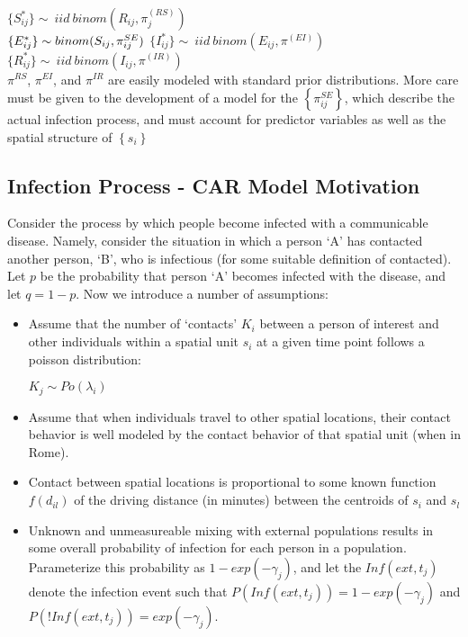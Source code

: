 \documentclass[12pt]{article}
\newcommand \noi {\noindent}
\begin{document}
    \vspace{0.15in}
        \noi
        $\{S_{ij}^*\} \sim\ iid\  binom(R_{ij}, \pi_j^{(RS)})$\\
        $\{E_{ij}^*\} \sim binom(S_{ij}, \pi^{SE}_{ij})\\$
        $\{I_{ij}^*\} \sim\ iid\  binom(E_{ij}, \pi^{(EI)})$\\
        $\{R_{ij}^*\} \sim\ iid\  binom(I_{ij}, \pi^{(IR)})$\\



$\pi^{RS}$, $\pi^{EI}$, and $\pi^{IR}$ are easily modeled with standard prior distributions. 
More care must be given to the development of a model for the $\left\{\pi^{SE}_{ij} \right\}$, which 
describe the actual infection process, and must account for predictor variables as well as the 
spatial structure of $\left\{ s_i \right\}$

\subsection{Infection Process - CAR Model Motivation}

Consider the process by which people become infected with a communicable disease. 
Namely, consider the situation in which a person `A' has contacted another person, `B', 
who is infectious (for some suitable definition of contacted). 
Let $p$ be the probability that person `A' becomes infected with the disease, and
let $q=1-p$. Now we introduce a number of assumptions:

\begin{itemize}

    \item Assume that the number of `contacts' $K_i$ between a person of interest 
    and other individuals within a spatial unit $s_i$ at a given time point follows a poisson 
    distribution:\\
    \begin{center}
        $K_j \sim Po(\lambda_i)$
    \end{center}
    \item Assume that when individuals travel to other spatial locations, their 
        contact behavior is well modeled by the contact behavior of that spatial unit (when in Rome).  
    \item Contact between spatial locations is proportional to some known function $f(d_{il})$
        of the driving distance (in minutes) between the centroids of $s_i$ and $s_l$
    \item Unknown and unmeasureable mixing with external populations results in some overall
        probability of infection for each person in a population. Parameterize this probability as $1-exp(-\gamma_j)$, and let 
        the $Inf(ext,t_j)$ denote the infection event such that $P(Inf(ext,t_j)) = 1-exp(-\gamma_j)$ and 
        $P(!Inf(ext,t_j)) = exp(-\gamma_j)$.
\end{itemize}
\end{document}
